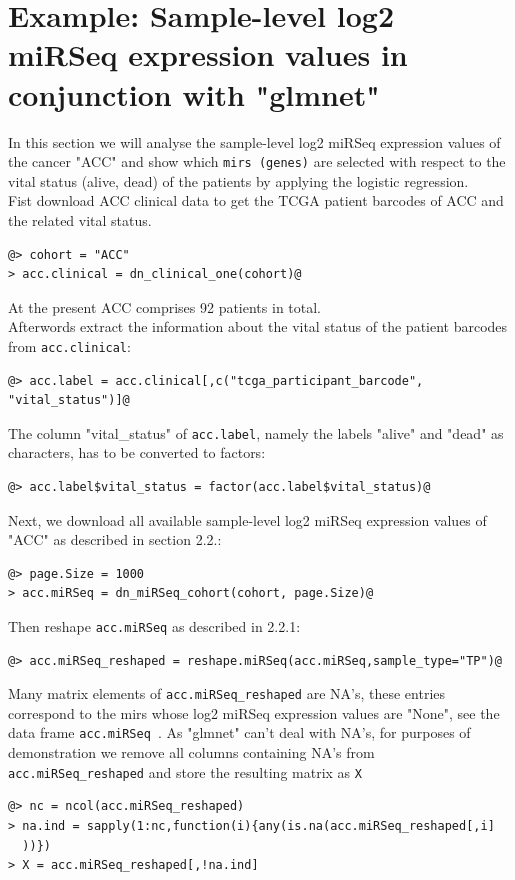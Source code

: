 \documentclass{TechReport}
\begin{document}
\section{Example: Sample-level log2 miRSeq expression values in conjunction with
"glmnet"}
In this section we will analyse the sample-level log2 miRSeq expression values of
the cancer "ACC" and show which
{\tt mirs (genes)} are selected with respect to the vital status (alive, dead) of
the patients by applying the logistic 
regression.\\
Fist download ACC clinical data to get the TCGA patient barcodes of ACC and the
related vital status.
\begin{lstlisting}[style=base]
@> cohort = "ACC"
> acc.clinical = dn_clinical_one(cohort)@
\end{lstlisting}
At the present ACC comprises 92 patients in total.\\ 
Afterwords extract the information about the vital status of the patient barcodes
from {\tt acc.clinical}:
\begin{lstlisting}[style=base]
@> acc.label = acc.clinical[,c("tcga_participant_barcode",
"vital_status")]@
\end{lstlisting}
The column "vital\_status" of {\tt acc.label}, namely the labels "alive" and "dead" as characters, 
has to be converted to factors:
\begin{lstlisting}[style=base]
@> acc.label$vital_status = factor(acc.label$vital_status)@
\end{lstlisting}
Next, we download all available sample-level log2 miRSeq expression values of "ACC"
as described in section 2.2.:
\begin{lstlisting}[style=base]
@> page.Size = 1000
> acc.miRSeq = dn_miRSeq_cohort(cohort, page.Size)@
\end{lstlisting}
Then reshape {\tt acc.miRSeq} as described in 2.2.1:
\begin{lstlisting}[style=base]
@> acc.miRSeq_reshaped = reshape.miRSeq(acc.miRSeq,sample_type="TP")@
\end{lstlisting}
Many matrix elements of {\tt acc.miRSeq\_reshaped} are NA's, these entries correspond
to the mirs whose log2 miRSeq expression values are "None", see the data frame {\tt acc.miRSeq }.
 As "glmnet" can't deal with NA's, for purposes of demonstration we remove all columns containing NA's
from {\tt acc.miRSeq\_reshaped} and store the resulting matrix as {\tt X}
\begin{lstlisting}[style=base]
@> nc = ncol(acc.miRSeq_reshaped)
> na.ind = sapply(1:nc,function(i){any(is.na(acc.miRSeq_reshaped[,i]
  ))})
> X = acc.miRSeq_reshaped[,!na.ind]
\end{lstlisting}
\end{document}
